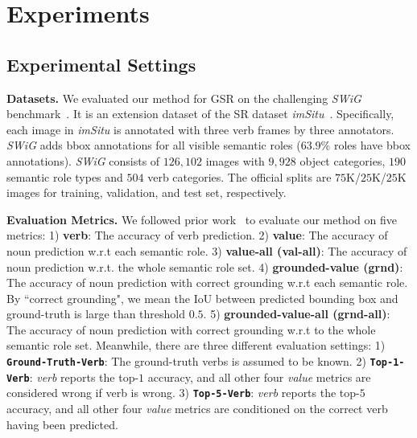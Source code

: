 \documentclass[letterpaper]{article} %
\begin{document}
    


\section{Experiments}
\subsection{Experimental Settings}

\noindent \textbf{Datasets.}
We evaluated our method for GSR on the challenging \textit{SWiG} benchmark~\cite{pratt2020grounded}. It is an extension dataset of the SR dataset \textit{imSitu}~\cite{yatskar2016situation}. Specifically, each image in \textit{imSitu} is annotated with three verb frames by three annotators. \textit{SWiG} adds bbox annotations for all visible semantic roles ($63.9\%$ roles have bbox annotations). \textit{SWiG} consists of $126,102$ images with $9,928$ object categories, $190$ semantic role types and $504$ verb categories. The official splits are $75$K/$25$K/$25$K images for training, validation, and test set, respectively. 

\noindent \textbf{Evaluation Metrics.}
We followed prior work~\cite{pratt2020grounded} to evaluate our method on five metrics: 1) \textbf{verb}: The accuracy of verb prediction. 2) \textbf{value}: The accuracy of noun prediction w.r.t each semantic role. 3) \textbf{value-all (val-all)}: The accuracy of noun prediction w.r.t. the whole semantic role set. 4) \textbf{grounded-value (grnd)}: The accuracy of noun prediction with correct grounding w.r.t each semantic role. By ``correct grounding", we mean the IoU between predicted bounding box and ground-truth is large than threshold $0.5$. 5) \textbf{grounded-value-all (grnd-all)}: The accuracy of noun prediction with correct grounding w.r.t to the whole semantic role set. Meanwhile, there are three different evaluation settings: 1) \textbf{\texttt{Ground-Truth-Verb}}: The ground-truth verbs is assumed to be known. 2) \textbf{\texttt{Top-1-Verb}}: \emph{verb} reports the top-$1$ accuracy, and all other four \emph{value} metrics are considered wrong if verb is wrong. 3) \textbf{\texttt{Top-5-Verb}}: \emph{verb} reports the top-$5$ accuracy, and all other four \emph{value} metrics are conditioned on the correct verb having been predicted.
\end{document}
